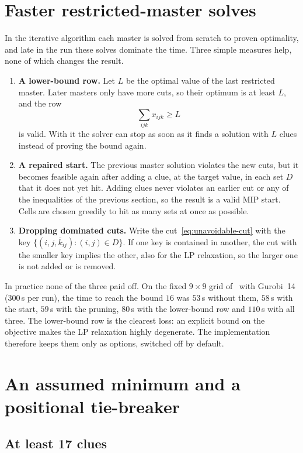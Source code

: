 \documentclass[11pt]{article}
\newcommand{\clue}{x}
\begin{document}
\section{Faster restricted-master solves}
\label{sec:master-speed}

In the iterative algorithm each master is solved from scratch to proven optimality, and late in the run these solves dominate the time. Three simple measures help, none of which changes the result.
\begin{enumerate}
    \item \textbf{A lower-bound row.} Let $L$ be the optimal value of the last restricted master. Later masters only have more cuts, so their optimum is at least $L$, and the row
    \[
    \sum_{ijk}\clue_{ijk}\ge L
    \]
    is valid. With it the solver can stop as soon as it finds a solution with $L$ clues instead of proving the bound again.
    \item \textbf{A repaired start.} The previous master solution violates the new cuts, but it becomes feasible again after adding a clue, at the target value, in each set $D$ that it does not yet hit. Adding clues never violates an earlier cut or any of the inequalities of the previous section, so the result is a valid MIP start. Cells are chosen greedily to hit as many sets at once as possible.
    \item \textbf{Dropping dominated cuts.} Write the cut~\eqref{eq:unavoidable-cut} with the key $\{(i,j,\bar k_{ij}):(i,j)\in D\}$. If one key is contained in another, the cut with the smaller key implies the other, also for the LP relaxation, so the larger one is not added or is removed.
\end{enumerate}

In practice none of the three paid off. On the fixed $9\times9$ grid of~\cite{mcguire} with Gurobi~14 (300\,s per run), the time to reach the bound $16$ was $53$\,s without them, $58$\,s with the start, $59$\,s with the pruning, $80$\,s with the lower-bound row and $110$\,s with all three. The lower-bound row is the clearest loss: an explicit bound on the objective makes the LP relaxation highly degenerate. The implementation therefore keeps them only as options, switched off by default.

\section{An assumed minimum and a positional tie-breaker}

\subsection{At least 17 clues}
\end{document}
